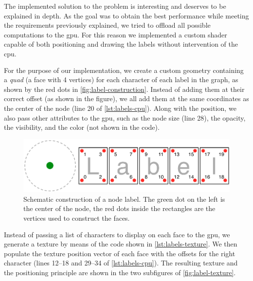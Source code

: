 The implemented solution to the problem is interesting and deserves to be explained in depth. As the goal was to obtain the best performance while meeting the requirements previously explained, we tried to offload all possible computations to the \gls{gpu}. For this reason we implemented a custom shader capable of both positioning and drawing the labels without intervention of the \gls{cpu}.

For the purpose of our implementation, we create a custom geometry containing a \emph{quad} (a face with 4 vertices) for each character of each label in the graph, as shown by the red dots in \vref{fig:label-construction}. Instead of adding them at their correct offset (as shown in the figure), we all add them at the same coordinates as the center of the node (line 20 of \vref{lst:labels-cpu}). Along with the position, we also pass other attributes to the \gls{gpu}, such as the node size (line 28), the opacity, the visibility, and the color (not shown in the code).

\begin{figure}
  \centering
  \includegraphics[width=.8\linewidth]{images/label-construction}
  \caption[Construction of the label for a node.]{Schematic construction of a node label. The green dot on the left is the center of the node, the red dots inside the rectangles are the vertices used to construct the faces.}
  \label{fig:label-construction}
\end{figure}

Instead of passing a list of characters to display on each face to the \gls{gpu}, we generate a texture by means of the code shown in \ref{lst:labels-texture}. We then populate the texture position vector of each face with the offsets for the right character (lines 12--18 and 29--34 of \ref{lst:labels-cpu}). The resulting texture and the positioning principle are shown in the two subfigures of \vref{fig:label-texture}.

